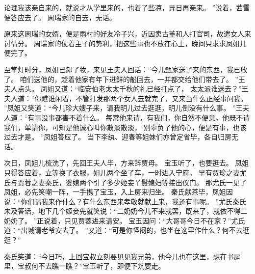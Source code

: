 论理我该亲自来的，就说才从学里来的，也着了些凉，异日再亲来。
”说着，茜雪便答应去了。
周瑞家的自去，无话。
\par
原来这周瑞的女婿，便是雨村的好友冷子兴，近因卖古董和人打官司，故遣女人来讨情分。
周瑞家的仗着主子的势利，把这些事也不放在心上，晚间只求求凤姐儿便完了。
\par
至掌灯时分，凤姐已卸了妆，来见王夫人回话：“今儿甄家送了来的东西，我已收了。
咱们送他的，趁着他家有年下进鲜的船回去，一并都交给他们带去了。
”王夫人点头。
凤姐又道：“临安伯老太太千秋的礼已经打点了，
太太派谁送去？”王夫人道：“你瞧谁闲着，不管打发那两个女人去就完了，又来当什么正经事问我。
”凤姐又笑道：“今儿珍大嫂子来，请我明儿过去逛逛，明儿倒没有什么事。
”王夫人道：“有事没事都害不着什么。
每常他来请，有我们，你自然不便意，他既不请我们，单请你，可知是他诚心叫你散淡散淡，
别辜负了他的心，便是有事，也该过去才是。
”凤姐答应了。
当下李纨、迎春等姐妹们亦曾定省毕，各自归房无话。
\par
次日，凤姐儿梳洗了，先回王夫人毕，方来辞贾母。
宝玉听了，也要逛去。
凤姐只得答应着，立等换了衣服，姐儿两个坐了车，一时进入宁府。
早有贾珍之妻尤氏与贾蓉之妻秦氏，婆媳两个引了多少姬妾丫鬟媳妇等接出仪门。
那尤氏一见了凤姐，必先笑嘲一阵，一手携了宝玉，入上房来归坐。
秦氏献茶毕，凤姐因说：“你们请我来作什么？有什么东西来孝敬就献上来，我还有事呢。
”尤氏秦氏未及答话，地下几个姬妾先就笑说：“二奶奶今儿不来就罢，既来了，就依不得二奶奶了。
”正说着，只见贾蓉进来请安。
宝玉因问：“大哥哥今日不在家？”尤氏道：“出城请老爷安去了。
”又道：“可是你怪闷的，也坐在这里作什么？何不去逛逛？”\par
秦氏笑道：“今日巧，上回宝叔立刻要见见我兄弟，他今儿也在这里，想在书房里，宝叔何不去瞧一瞧？”宝玉听了，即便下炕要走。
